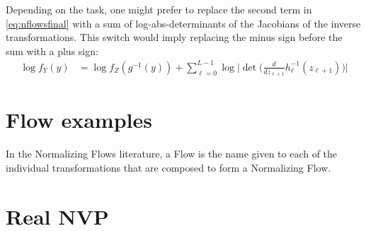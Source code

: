 Depending on the task, one might prefer to replace the second term in \ref{eq:nflowsfinal}
with a sum of log-abs-determinants of the Jacobians of the inverse transformations.
This switch would imply replacing the minus sign before the sum with a plus sign:
\begin{align}
    \log f_Y(y) &= \log f_Z(g^{-1}(y)) + \sum_{\ell=0}^{L-1} \log \Big|\det\Big(\frac{d}{dz_{\ell+1}}h_{\ell}^{-1}(z_{\ell+1})\Big) \Big|
\end{align}


\section{Flow examples}
In the Normalizing Flows literature, a Flow is the name given to each of the
individual transformations that are composed to form a Normalizing Flow.

\section{Real NVP}


